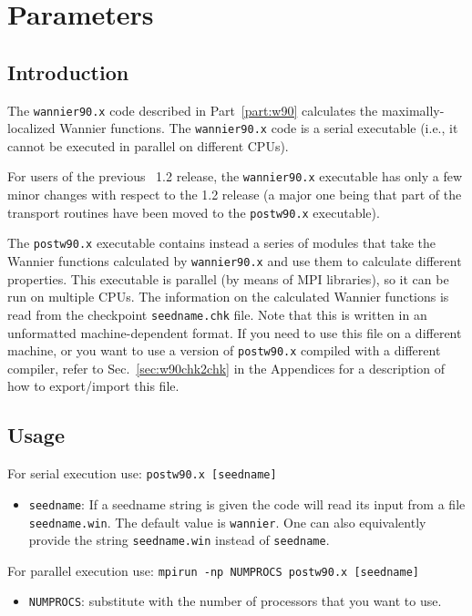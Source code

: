 \chapter{Parameters}

\section{Introduction}
The \texttt{wannier90.x} code described in Part~\ref{part:w90}
calculates the maximally-localized Wannier functions. The \texttt{wannier90.x} code is a
serial executable (i.e., it cannot be executed in parallel on different
CPUs).

For users of the previous \wannier\ 1.2 release, the
\texttt{wannier90.x} executable has only a few minor changes with
respect to the 1.2 release (a major one being that part of the
transport routines have been moved to the \texttt{postw90.x}
executable).

The \texttt{postw90.x} executable contains instead a series of modules
that take the Wannier functions calculated by \texttt{wannier90.x} and
use them to calculate different properties.  This executable is
parallel (by means of MPI libraries), so it can be run on multiple
CPUs.  The information on the calculated Wannier functions is read
from the checkpoint \verb|seedname.chk| file. Note that this is
written in an unformatted machine-dependent format. If you need to use
this file on a different machine, or you want to use a version of
\texttt{postw90.x} compiled with a different compiler, refer to
Sec.~\ref{sec:w90chk2chk} in the Appendices for a description of how
to export/import this file.

\section{Usage}
For serial execution use: {\tt postw90.x [seedname]} 

\begin{itemize} \item 
{\tt seedname}: If a seedname string is given the code
will read its input from a file {\tt seedname.win}. The default
  value is {\tt wannier}. One can also equivalently provide the string
  {\tt seedname.win} instead of  {\tt seedname}.
\end{itemize}

For parallel execution use: {\tt mpirun -np NUMPROCS postw90.x [seedname]}

\begin{itemize} \item 
{\tt NUMPROCS}: substitute with the number of processors that you want
to use.
\end{itemize}

